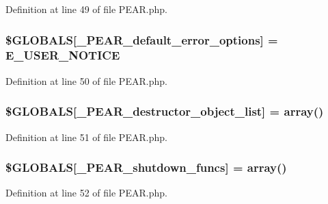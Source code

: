 Definition at line 49 of file P\+E\+A\+R.\+php.

\subsubsection[{\texorpdfstring{\$\+G\+L\+O\+B\+A\+LS}{$GLOBALS}}]{\setlength{\rightskip}{0pt plus 5cm}\$G\+L\+O\+B\+A\+LS\mbox{[}\textquotesingle{}\+\_\+\+P\+E\+A\+R\+\_\+default\+\_\+error\+\_\+options\textquotesingle{}\mbox{]} = E\+\_\+\+U\+S\+E\+R\+\_\+\+N\+O\+T\+I\+CE}\hypertarget{PEAR_8php_a9a627cdd7a06f69e65a763b541b3540c}{}\label{PEAR_8php_a9a627cdd7a06f69e65a763b541b3540c}


Definition at line 50 of file P\+E\+A\+R.\+php.

\subsubsection[{\texorpdfstring{\$\+G\+L\+O\+B\+A\+LS}{$GLOBALS}}]{\setlength{\rightskip}{0pt plus 5cm}\$G\+L\+O\+B\+A\+LS\mbox{[}\textquotesingle{}\+\_\+\+P\+E\+A\+R\+\_\+destructor\+\_\+object\+\_\+list\textquotesingle{}\mbox{]} = array()}\hypertarget{PEAR_8php_a46e1d062e4e9379133e4b4806e9f4cdd}{}\label{PEAR_8php_a46e1d062e4e9379133e4b4806e9f4cdd}


Definition at line 51 of file P\+E\+A\+R.\+php.

\subsubsection[{\texorpdfstring{\$\+G\+L\+O\+B\+A\+LS}{$GLOBALS}}]{\setlength{\rightskip}{0pt plus 5cm}\$G\+L\+O\+B\+A\+LS\mbox{[}\textquotesingle{}\+\_\+\+P\+E\+A\+R\+\_\+shutdown\+\_\+funcs\textquotesingle{}\mbox{]} = array()}\hypertarget{PEAR_8php_a1e8a8915e879323948ae30d5217c515c}{}\label{PEAR_8php_a1e8a8915e879323948ae30d5217c515c}


Definition at line 52 of file P\+E\+A\+R.\+php.

